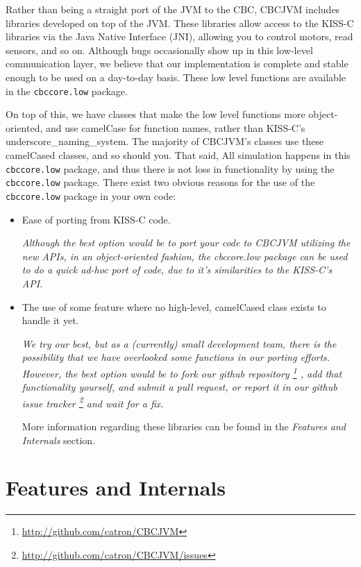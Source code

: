 \documentclass[12pt,letterpaper]{article}
\newcommand{\urlfootnote}[1]{\footnote{\url{#1}}}
\begin{document}
Rather than being a straight port of the JVM to the CBC, CBCJVM includes libraries developed on top of the JVM. These libraries allow access to the KISS-C libraries via the Java Native Interface (JNI), allowing you to control motors, read sensors, and so on. Although bugs occasionally show up in this low-level communication layer, we believe that our implementation is complete and stable enough to be used on a day-to-day basis. These low level functions are available in the \texttt{cbccore.low} package.

On top of this, we have classes that make the low level functions more object-oriented, and use camelCase for function names, rather than KISS-C's underscore{\_}naming{\_}system. The majority of CBCJVM's classes use these camelCased classes, and so should you. That said, All simulation happens in this \texttt{cbccore.low} package, and thus there is not loss in functionality by using the \texttt{cbccore.low} package. There exist two obvious reasons for the use of the \texttt{cbccore.low} package in your own code:
\begin{itemize}
\item Ease of porting from KISS-C code.

\textit{Although the best option would be to port your code to CBCJVM utilizing the new APIs, in an object-oriented fashion, the \textit{cbccore.low} package can be used to do a quick ad-hoc port of code, due to it's similarities to the KISS-C's API.}

\item The use of some feature where no high-level, camelCased class exists to handle it yet.

\textit{We try our best, but as a (currently) small development team, there is the possibility that we have overlooked some functions in our porting efforts. However, the best option would be to fork\cite{forking} our github repository
\urlfootnote{http://github.com/catron/CBCJVM} %
, add that functionality yourself, and submit a pull request\cite{pullRequest}, or report it in our github issue tracker \urlfootnote{http://github.com/catron/CBCJVM/issues} %
and wait for a fix.}

More information regarding these libraries can be found in the \textit{Features and Internals} section.
\end{itemize}



\pagebreak
\section{Features and Internals}
\end{document}
